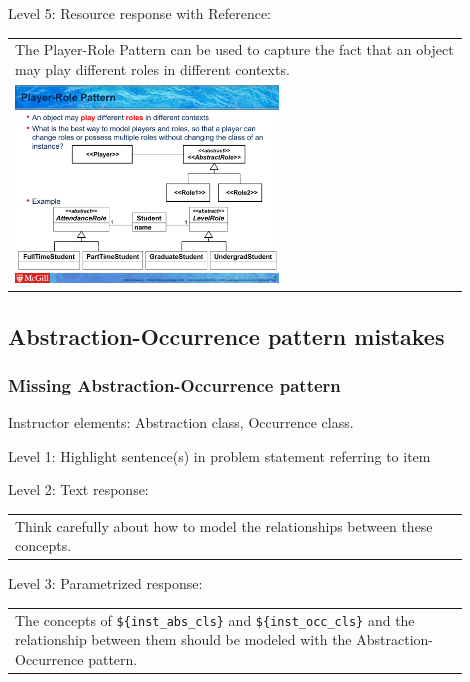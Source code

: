 \noindent Level 5: Resource response with Reference: \medskip

\begin{tabular}{|p{0.9\linewidth}}
The Player-Role Pattern can be used to capture the fact that an object may play different roles
in different contexts.

\\
\includegraphics[width=0.6\textwidth]{images/player_role.png}
\end{tabular} \medskip


\subsection{Abstraction-Occurrence pattern mistakes}

\subsubsection{Missing Abstraction-Occurrence pattern}

Instructor elements: Abstraction class, Occurrence class. \medskip

\noindent Level 1: Highlight sentence(s) in problem statement referring to item \medskip

\noindent Level 2: Text response: \medskip

\begin{tabular}{|p{0.9\linewidth}}
Think carefully about how to model the relationships between these concepts.
\end{tabular} \medskip

\noindent Level 3: Parametrized response: \medskip

\begin{tabular}{|p{0.9\linewidth}}
The concepts of \verb|${inst_abs_cls}| and \verb|${inst_occ_cls}| and the relationship between them should be modeled with the Abstraction-Occurrence pattern.
\end{tabular} \medskip

